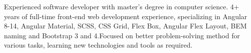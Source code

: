 

\begin{cvparagraph}

Experienced software developer with master's degree in computer science. 4+ years of full-time front-end web development experience, specializing in Angular 8-14,  Angular Material, SCSS, CSS Grid, Flex Box, Angular Flex Layout, BEM naming and Bootstrap 3 and 4.Focused on better problem-solving method for various tasks, learning new technologies and tools as required.
\end{cvparagraph}
